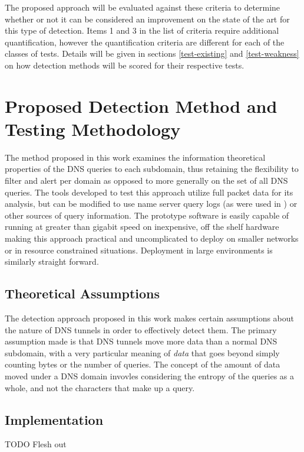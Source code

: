 \documentclass[12pt]{report}
\theoremstyle{remark}
\theoremstyle{definition}
\theoremstyle{definition}
\theoremstyle{definition}
\begin{document}
The proposed approach will be evaluated against these criteria to determine
whether or not it can be considered an improvement on the state of the art for
this type of detection. Items 1 and 3 in the list of criteria require additional
quantification, however the quantification criteria are different for each of
the classes of tests. Details will be given in sections \ref{test-existing} and
\ref{test-weakness} on how detection methods will be scored for their respective
tests.

\chapter{Proposed Detection Method and Testing Methodology}
\label{proposed-method}

The method proposed in this work examines the information theoretical properties
of the DNS queries to each subdomain, thus retaining the flexibility to filter
and alert per domain as opposed to more generally on the set of all DNS queries.
The tools developed to test this approach utilize full packet data for its
analysis, but can be modified to use name server query logs (as were used in
\cite{Romana2007}) or other sources of query information. The prototype software
is easily capable of running at greater than gigabit speed on inexpensive, off
the shelf hardware making this approach practical and uncomplicated to deploy on
smaller networks or in resource constrained situations. Deployment in large
environments is similarly straight forward.

\section{Theoretical Assumptions}
The detection approach proposed in this work
makes certain assumptions about the nature of DNS tunnels in order to
effectively detect them. The primary assumption made is that DNS tunnels move
more data than a normal DNS subdomain, with a very particular meaning of
\emph{data} that goes beyond simply counting bytes or the number of queries. The
concept of the amount of data moved under a DNS domain invovles considering the
entropy of the queries as a whole, and not the characters that make up a query.

\section{Implementation}
\label{implementation}
TODO Flesh out
\end{document}
